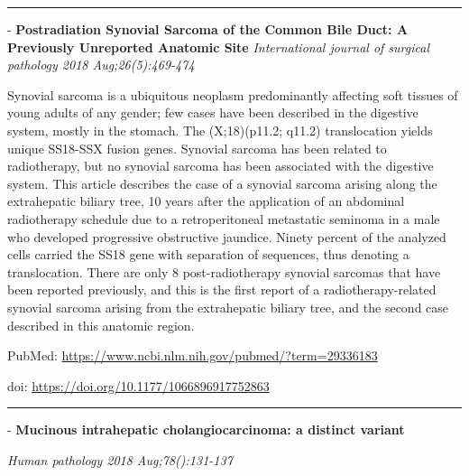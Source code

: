 \documentclass[]{article}
\begin{document}
{}

{}

\begin{center}\rule{0.5\linewidth}{\linethickness}\end{center}

 - \textbf{Postradiation Synovial Sarcoma of the Common Bile Duct: A
Previously Unreported Anatomic Site} \emph{International journal of
surgical pathology 2018 Aug;26(5):469-474}

Synovial sarcoma is a ubiquitous neoplasm predominantly affecting soft
tissues of young adults of any gender; few cases have been described in
the digestive system, mostly in the stomach. The (X;18)(p11.2; q11.2)
translocation yields unique SS18-SSX fusion genes. Synovial sarcoma has
been related to radiotherapy, but no synovial sarcoma has been
associated with the digestive system. This article describes the case of
a synovial sarcoma arising along the extrahepatic biliary tree, 10 years
after the application of an abdominal radiotherapy schedule due to a
retroperitoneal metastatic seminoma in a male who developed progressive
obstructive jaundice. Ninety percent of the analyzed cells carried the
SS18 gene with separation of sequences, thus denoting a translocation.
There are only 8 post-radiotherapy synovial sarcomas that have been
reported previously, and this is the first report of a
radiotherapy-related synovial sarcoma arising from the extrahepatic
biliary tree, and the second case described in this anatomic region.

PubMed: \url{https://www.ncbi.nlm.nih.gov/pubmed/?term=29336183}

doi: \url{https://doi.org/10.1177/1066896917752863}

{}

{}

\begin{center}\rule{0.5\linewidth}{\linethickness}\end{center}

 - \textbf{Mucinous intrahepatic cholangiocarcinoma: a distinct variant}

\emph{Human pathology 2018 Aug;78():131-137}
\end{document}
